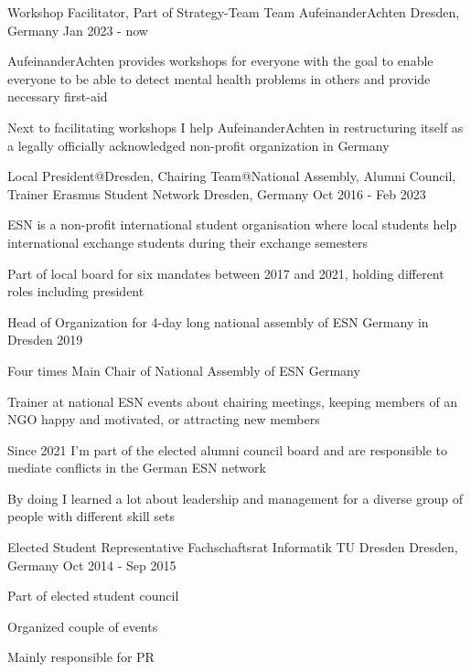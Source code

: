 \begin{cventries}
 \cventry
	{Workshop Facilitator, Part of Strategy-Team} %
	{Team AufeinanderAchten} %
	{Dresden, Germany} %
	{Jan 2023 - now} %
	{
		\begin{cvitems} %
			\item{AufeinanderAchten provides workshops for everyone with the goal to enable everyone to be able to detect mental health problems in others and provide necessary first-aid}
			\item{Next to facilitating workshops I help AufeinanderAchten in restructuring itself as a legally officially acknowledged non-profit organization in Germany}
		\end{cvitems}
	}

 
    \cventry
	{Local President@Dresden, Chairing Team@National Assembly, Alumni Council, Trainer} %
	{Erasmus Student Network} %
	{Dresden, Germany} %
	{Oct 2016 - Feb 2023} %
	{
		\begin{cvitems} %
			\item{ESN is a non-profit international student organisation where local students help international exchange students during their exchange semesters}
			\item{Part of local board for six mandates between 2017 and 2021, holding different roles including president}
			\item{Head of Organization for 4-day long national assembly of ESN Germany in Dresden 2019}
			\item{Four times Main Chair of National Assembly of ESN Germany}
            \item{Trainer at national ESN events about chairing meetings, keeping members of an NGO happy and motivated, or attracting new members}
            \item{Since 2021 I'm part of the elected alumni council board and are responsible to mediate conflicts in the German ESN network}
			\item { By doing I learned a lot about leadership and management for a diverse group of people with different skill sets}
		\end{cvitems}
	}

	\cventry
	{Elected Student Representative} %
	{Fachschaftsrat Informatik TU Dresden} %
	{Dresden, Germany} %
	{Oct 2014 - Sep 2015} %
	{
		\begin{cvitems} %
			\item{Part of elected student council}
			\item{Organized couple of events}
			\item{Mainly responsible for PR}
		\end{cvitems}
	}



\end{cventries}
